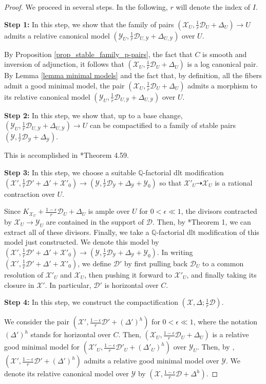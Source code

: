 \documentclass{amsart}
\newcommand{\cD}{\mathcal{D}}
\newcommand{\cX}{\mathcal{X}}
\newcommand{\cY}{\mathcal{Y}}
\theoremstyle{definition}
\newcommand{\rar}{\rightarrow}
\newcommand{\drar}{\dashrightarrow}
\renewcommand{\qq}{\mathbb{Q}}
\begin{document}
\begin{proof}
We proceed in several steps.
In the following, $r$ will denote the index of $I$.

{\bf Step 1:} In this step, we show that the family of pairs $(\cX_U,\frac{1}{r}\cD_U + \Delta_U) \rar U$ admits a relative canonical model $(\cY_U, \frac{1}{r}\cD _{U,\cY} + \Delta_{U, \cY})$ over $U$.

By Proposition \ref{prop_stable_family_p-pairs}, the fact that $C$ is smooth and inversion of adjunction, it follows that $(\cX _U, \frac{1}{r}\cD_U + \Delta_U)$ is a log canonical pair.
By Lemma \ref{lemma minimal models} and the fact that, by definition, all the fibers admit a good minimal model, the pair $(\cX _U, \frac{1}{r}\cD_U + \Delta_U)$ admits a morphism to its relative canonical model $(\cY_U, \frac{1}{r}\cD _{U,\cY} + \Delta_{U, \cY})$ over $U$.

{\bf Step 2:} In this step, we show that, up to a base change, $(\cY_U, \frac{1}{r}\cD _{U,\cY} + \Delta_{U,\cY}) \rar U$ can be compactified to a family of stable pairs $(\cY,\frac{1}{r}\cD_\cY + \Delta_\cY)$.

This is accomplished in \cite{kol_new}*{Theorem 4.59}.


{\bf Step 3:} In this step, we choose a suitable $\qq$-factorial dlt modification $(\cX', \frac{1}{r}\cD' + \Delta'+\cX'_0) \rightarrow (\cY, \frac{1}{r}\cD _{\cY} + \Delta_{\cY}+\cY_0)$ so that $\cX'_U \drar \cX_U$ is a rational contraction over $U$.




Since $K_{\cX_U}+\frac{1-\epsilon}{r}\cD_U + \Delta_U$ is ample over $U$ for $0 < \epsilon \ll 1$, the divisors contracted by $\cX_U \rightarrow \cY_U$ are contained in the support of $\cD$.
Then, by \cite{Mor19}*{Theorem 1}, we can extract all of these divisors.
Finally, we take a $\qq$-factorial dlt modification of this model just constructed.
We denote this model by $(\cX', \frac{1}{r}\cD' + \Delta'+\cX'_0) \rightarrow (\cY, \frac{1}{r}\cD _{\cY} + \Delta_{\cY}+\cY_0)$.
In writing $(\cX', \frac{1}{r}\cD' + \Delta'+\cX'_0)$, we define $\cD'$ by first pulling back $\cD_U$ to a common resolution of $\cX'_U$ and $\cX_U$, then pushing it forward to $\cX'_U$, and finally taking its closure in $\cX'$.
In particular, $\cD'$ is horizontal over $C$.


{\bf Step 4:} In this step, we construct the compactification $(\cX,\Delta;\frac{1}{r}\cD)$.

We consider the pair $(\cX', \frac{1-\epsilon}{r}\cD' + (\Delta')^h)$ for $0<\epsilon \ll 1$, where the notation $(\Delta')^h$ stands for horizontal over $C$.
Then, $(\cX_U,\frac{1-\epsilon}{r}\cD_U+\Delta_U)$ is a relative good minimal model for $(\cX'_U, \frac{1-\epsilon}{r}\cD'_U + (\Delta'_U)^h)$ over $\cY_U$.
Then, by \cite{HX13}, $(\cX', \frac{1-\epsilon}{r}\cD' + (\Delta')^h)$ admits a relative good minimal model over $\cY$.
We denote its relative canonical model over $\cY$ by $(\cX,\frac{1-\epsilon}{r}\cD+\Delta^h)$.


\end{proof}
\end{document}
